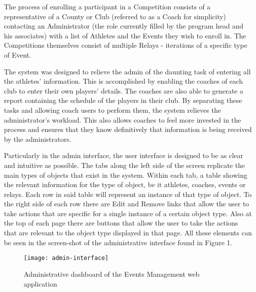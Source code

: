 \documentclass[sigconf]{acmart}
\begin{document}
The process of enrolling a participant in a Competition consists of a representative of a County or Club (referred to as a Coach for simplicity) contacting an Administrator (the role currently filled by the program head and his associates) with a list of Athletes and the Events they wish to enroll in. The Competitions themselves consist of multiple Relays - iterations of a specific type of Event. 

The system was designed to relieve the admin of the daunting task of entering all the athletes' information. This is accomplished by enabling the coaches of each club to enter their own players' details. The coaches are also able to generate a report containing the schedule of the players in their club. By separating these tasks and allowing coach users to perform them, the system relieves the administrator's workload. This also allows coaches to feel more invested in the process and ensures that they know definitively that information is being received by the administrators.

Particularly in the admin interface, the user interface is designed to be as clear and intuitive as possible. The tabs along the left side of the screen replicate the main types of objects that exist in the system. Within each tab, a table showing the relevant information for the type of object, be it athletes, coaches, events or relays. Each row in said table will represent an instance of that type of object. To the right side of each row there are Edit and Remove links that allow the user to take actions that are specific for a single instance of a certain object type. Also at the top of each page there are buttons that allow the user to take the actions that are relevant to the object type displayed in that page. All these elements can be seen in the screen-shot of the administrative interface found in Figure 1.

\begin{figure}[h]
  \centering
  \texttt{[image: admin-interface]}
  \caption{Administrative dashboard of the Events Management web application}
\end{figure}
\end{document}
